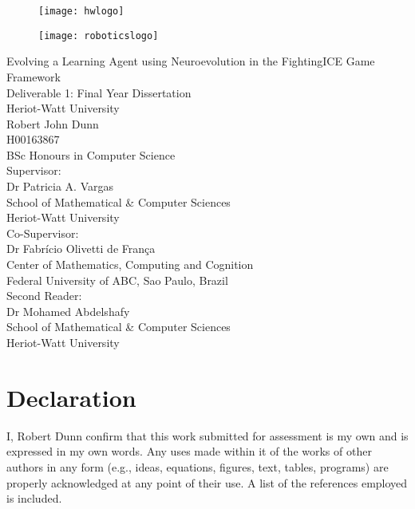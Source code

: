 \documentclass[12pt,a4paper]{article}
\begin{document}
\thispagestyle{empty}
\begin{figure}
\centering
\begin{minipage}{.5\textwidth}
  \centering
  \texttt{[image: hwlogo]}
  \label{fig:test1}
\end{minipage}%
\begin{minipage}{.5\textwidth}
  \centering
  \texttt{[image: roboticslogo]}
  \label{fig:test2}
\end{minipage}
\end{figure}
{
\centering
\vspace{10mm}
{\huge Evolving a Learning Agent using Neuroevolution in the FightingICE Game Framework}\\
\vspace{20mm}
{\large Deliverable 1: Final Year Dissertation}\\
{\large Heriot-Watt University}\\
\vspace{10mm}
{\large Robert John Dunn\\
H00163867\\
BSc Honours in Computer Science\\
}
\vspace{10mm}
{\large Supervisor:}\\
Dr Patricia A. Vargas\\
School of Mathematical \& Computer Sciences\\
Heriot-Watt University
\vspace{3mm}\\
{\large Co-Supervisor:}\\
Dr Fabrício Olivetti de França\\
Center of Mathematics, Computing and Cognition\\
Federal University of ABC, Sao Paulo, Brazil
\vspace{3mm}\\
Second Reader:\\
Dr Mohamed Abdelshafy\\
School of Mathematical \& Computer Sciences\\
Heriot-Watt University\\}
\newpage
\thispagestyle{empty}
\vspace*{30mm}
\section*{Declaration}
I,  Robert Dunn confirm that this work submitted for assessment is my own and is expressed
in my own words. Any uses made within it of the works of other authors in any
form (e.g., ideas, equations, figures, text, tables, programs) are properly acknowledged
at any point of their use. A list of the references employed is included.\\
\end{document}
